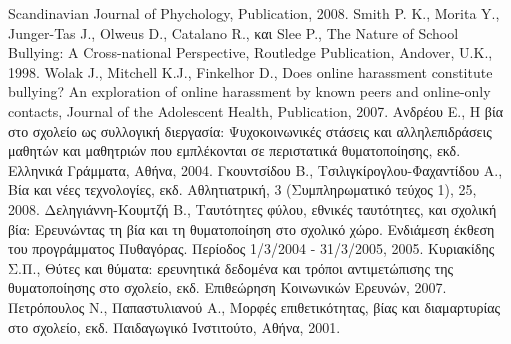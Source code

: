 \documentclass[12pt,a4paper,oneside]{book}
\begin{document}
\begin{thebibliography}{0}
Scandinavian Journal of Phychology, Publication, 2008.
Smith P. K., Morita Y., Junger-Tas J., Olweus D., Catalano R., και  Slee
P., The Nature of School Bullying: A Cross-national Perspective, Routledge
Publication, Andover, U.K., 1998.
 Wolak J., Mitchell K.J., Finkelhor D., Does online harassment constitute
 bullying? An exploration of online harassment by known peers and online-only
 contacts, Journal of the Adolescent Health, Publication, 2007.
Ανδρέου Ε., Η βία στο σχολείο ως συλλογική διεργασία: Ψυχοκοινωνικές στάσεις
και αλληλεπιδράσεις μαθητών και μαθητριών που εμπλέκονται σε περιστατικά
θυματοποίησης, εκδ. Ελληνικά Γράμματα, Αθήνα, 2004.
Γκουντσίδου Β., Τσιλιγκίρογλου-Φαχαντίδου Α., Βία και νέες τεχνολογίες,
εκδ. Αθλητιατρική, 3 (Συμπληρωματικό τεύχος 1), 25, 2008.
Δεληγιάννη-Κουμτζή Β., Ταυτότητες φύλου, εθνικές ταυτότητες, και σχολική βία:
Ερευνώντας τη βία και τη θυματοποίηση στο σχολικό χώρο. Ενδιάμεση έκθεση του
προγράμματος Πυθαγόρας. Περίοδος 1/3/2004 - 31/3/2005, 2005.
Κυριακίδης Σ.Π., Θύτες και θύματα: ερευνητικά δεδομένα και τρόποι αντιμετώπισης
της θυματοποίησης στο σχολείο, εκδ. Επιθεώρηση Κοινωνικών Ερευνών, 2007.
Πετρόπουλος Ν., Παπαστυλιανού Α., Μορφές επιθετικότητας, βίας και διαμαρτυρίας
στο σχολείο, εκδ. Παιδαγωγικό Ινστιτούτο, Αθήνα, 2001.
\end{thebibliography}
\pagebreak\centering\setlength{\parindent}{10pt} 
\tableofcontents
\end{document}
